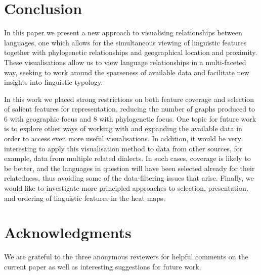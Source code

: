 \documentclass[11pt]{article}
\begin{document}
%
%
%


\section{Conclusion}
In this paper we present a new approach to visualising relationships between languages, one which allows for the simultaneous viewing of linguistic features together with phylogenetic relationships and geographical location and proximity. These visualisations allow us to view language relationships in a multi-faceted way, seeking to work around the sparseness of available data and facilitate new insights into linguistic typology.

In this work we placed strong restrictions on both feature coverage and selection of salient features for representation, reducing the number of graphs produced to 6 with geographic focus and 8 with phylogenetic focus. One topic for future work is to explore other ways of working with and expanding the available data in order to access even more useful visualisations. In addition, it would be very interesting to apply this visualisation method to data from other sources, for example, data from multiple related dialects. In such cases, coverage is likely to be better, and the languages in question will have been selected already for their relatedness, thus avoiding some of the data-filtering issues that arise. Finally, we would like to investigate more principled approaches to selection, presentation, and ordering of linguistic features in the heat maps. 

\section*{Acknowledgments}
We are grateful to the three anonymous reviewers for helpful comments on the current paper as well as interesting suggestions for future work.



\end{document}
